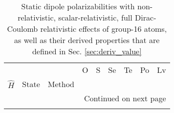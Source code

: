 \begin{longtable}{lllllllll}
\caption{Static dipole polarizabilities with non-relativistic, scalar-relativistic, full Dirac-Coulomb relativistic effects of group-16 atoms, as well as their derived properties that are defined in Sec. \ref{sec:deriv_value}}\label{tab:dipole_group_16}\\
\toprule
      &       &                                    &            O &             S &            Se &          Te &          Po &    Lv \\
$\hat{H}$ & State & Method &              &               &               &             &             &       \\
\midrule
\endhead
\midrule
\multicolumn{9}{r}{{Continued on next page}} \\
\midrule
\endfoot


\end{longtable}
